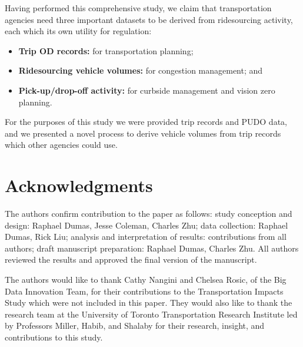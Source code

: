 \documentclass[]{trbunofficial_bdit_final}
\begin{document}
Having performed this comprehensive study, we claim that transportation
agencies need three important datasets to be derived from ridesourcing
activity, each which its own utility for regulation:

\begin{itemize}
\tightlist
\item
  \textbf{Trip OD records:} for transportation planning;
\item
  \textbf{Ridesourcing vehicle volumes:} for congestion management; and
\item
  \textbf{Pick-up/drop-off activity:} for curbside management and vision zero
  planning.
\end{itemize}

For the purposes of this study we were provided trip records and PUDO data, and
we presented a novel process to derive vehicle volumes from trip records which
other agencies could use.

\hypertarget{sec:acknowledgments}{%
\section{Acknowledgments}\label{sec:acknowledgments}}

The authors confirm contribution to the paper as follows: study conception and
design: Raphael Dumas, Jesse Coleman, Charles Zhu; data collection: Raphael
Dumas, Rick Liu; analysis and interpretation of results: contributions from all
authors; draft manuscript preparation: Raphael Dumas, Charles Zhu. All authors
reviewed the results and approved the final version of the manuscript.

The authors would like to thank Cathy Nangini and Chelsea Rosic, of the Big
Data Innovation Team, for their contributions to the Transportation Impacts
Study which were not included in this paper. They would also like to thank the
research team at the University of Toronto Transportation Research Institute
led by Professors Miller, Habib, and Shalaby for their research, insight, and
contributions to this study.
\end{document}
